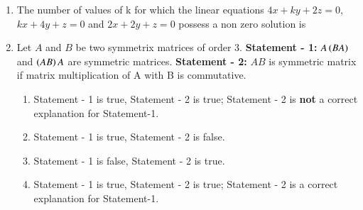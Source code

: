 \documentclass[journal,12pt,twocolumn]{IEEEtran}
\theoremstyle{remark}
\begin{document}
\begin{enumerate}
    \item The number of values of k for which the linear equations $4x + ky + 2z = 0$, $kx + 4y + z = 0$ and $2x + 2y + z=0$ possess a non zero solution is 
	\hfill {}{\par}
        \begin{enumerate}[label={(\alph*)}]
        \end{enumerate}

    \item Let $A$ and $B$ be two symmetrix matrices of order $3$.
	\newline
	\textbf{Statement - 1:} $A\left(BA\right)$ and $\left(AB\right)A$ are symmetric matrices. 
	\newline
	\textbf{Statement - 2:} $AB$ is symmetric matrix if matrix multiplication of A with B is commutative.

	\begin{enumerate}[label={(\alph*)}]
		\item Statement - 1 is true, Statement - 2 is true; Statement - 2 is \textbf{not} a correct explanation for Statement-1. 
	    	\item Statement - 1 is true, Statement - 2 is false. 
	    	\item Statement - 1 is false, Statement - 2 is true.
	    	\item Statement - 1 is true, Statement - 2 is true; Statement - 2 is a correct explanation for Statement-1. 
	\end{enumerate}


\end{enumerate}
\end{document}
